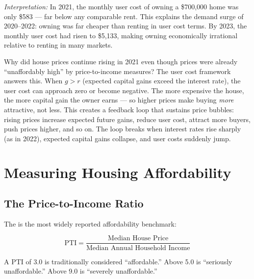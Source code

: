 \noindent\textit{Interpretation:} In 2021, the monthly user cost of owning
a \$700{,}000 home was only \$583 --- far below any comparable rent.
This explains the demand surge of 2020--2022: owning was far cheaper than
renting in user cost terms. By 2023, the monthly user cost had risen to
\$5{,}133, making owning economically irrational relative to renting
in many markets.

\begin{thinkbox}
Why did house prices continue rising in 2021 even though prices were already
``unaffordably high'' by price-to-income measures? The user cost framework
answers this. When $g > r$ (expected capital gains exceed the interest rate),
the user cost can approach zero or become negative. The more expensive the
house, the more capital gain the owner earns --- so higher prices make buying
\textit{more} attractive, not less. This creates a feedback loop that sustains
price bubbles: rising prices increase expected future gains, reduce user cost,
attract more buyers, push prices higher, and so on. The loop breaks when
interest rates rise sharply (as in 2022), expected capital gains collapse,
and user costs suddenly jump.
\end{thinkbox}

\section{Measuring Housing Affordability}
\label{sec:affordability_measurement}

\subsection{The Price-to-Income Ratio}

The  is the most widely reported
affordability benchmark:

\begin{equation}
  \text{PTI} = \frac{\text{Median House Price}}{\text{Median Annual Household Income}}
  \label{eq:pti}
\end{equation}

A PTI of 3.0 is traditionally considered ``affordable.''
Above 5.0 is ``seriously unaffordable.'' Above 9.0 is ``severely unaffordable.''

